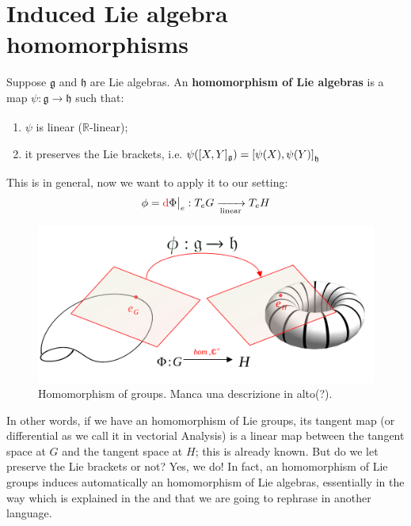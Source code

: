 \documentclass[../main.tex]{subfiles}
\begin{document}
\section{Induced Lie algebra homomorphisms}
\begin{definition}
Suppose $\mathfrak{g}$ and $\mathfrak{h}$ are Lie algebras. An \textbf{homomorphism of Lie algebras} is a map $\psi:\mathfrak{g}\xrightarrow[]{}\mathfrak{h}$ such that:
\renewcommand{\labelenumi}{\Roman{enumi})}
\begin{enumerate}
\item $\psi$ is linear ($\mathbb{R}$-linear);
\item it preserves the Lie brackets, i.e. $\psi([X,Y]_\mathfrak{g})=\comm{\psi(X)}{\psi(Y)}_\mathfrak{h}$
\end{enumerate}
\end{definition}
This is in general, now we want to apply it to our setting:
\[
\phi={\color{red}\textrm{d}}\Phi\big|_e:T_eG\xrightarrow[\textrm{linear}]{}T_eH
\]
\begin{figure}[H]
    \centering
    \includegraphics{images/map_homo.pdf}
    \caption{Homomorphism of groups. Manca una descrizione in alto(?).}
\end{figure}
In other words, if we have an homomorphism of Lie groups, its tangent map (or differential as we call it in vectorial Analysis) is a linear map between the tangent space at $G$ and the tangent space at $H$; this is already known. But do we let preserve the Lie brackets or not? Yes, we do! In fact, an homomorphism of Lie groups induces automatically an homomorphism of Lie algebras, essentially in the way which is explained in the  and that we are going to rephrase in another language.
\end{document}
